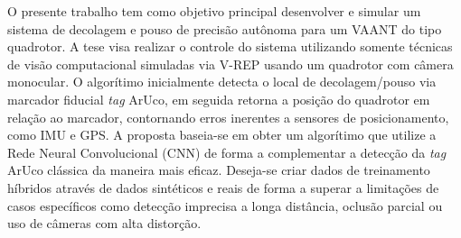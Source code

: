 O presente trabalho tem como objetivo principal desenvolver e simular um sistema de decolagem e pouso de precisão autônoma para um VAANT do tipo quadrotor. A tese visa realizar o controle do sistema utilizando somente técnicas de visão computacional simuladas via V-REP usando um quadrotor com câmera monocular. O algorítimo inicialmente detecta o local de decolagem/pouso via marcador fiducial \textit{tag} ArUco, em seguida retorna a posição do quadrotor em relação ao marcador, contornando erros inerentes a sensores de posicionamento, como IMU e GPS. A proposta baseia-se em obter um algorítimo que utilize a Rede Neural Convolucional (CNN) de forma a complementar a detecção da \textit{tag} ArUco clássica da maneira mais eficaz. Deseja-se criar dados de treinamento híbridos através de dados sintéticos e reais de forma a superar a limitações de casos específicos como detecção imprecisa a longa distância, oclusão parcial ou uso de câmeras com alta distorção.

\vspace{\fill}

    
    
  
  
  
  
  
  
